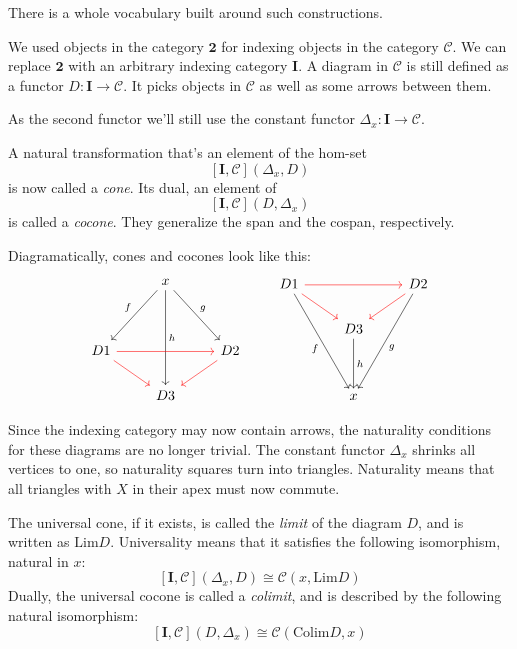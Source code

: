 \documentclass[DaoFP]{subfiles}
\begin{document}
There is a whole vocabulary built around such constructions. 

We used objects in the category $\mathbf{2}$ for indexing objects in the category $\mathcal{C}$. We can replace $\mathbf{2}$ with an arbitrary indexing category $\mathbf{I}$. A diagram in $\mathcal{C}$ is still defined as a functor $D \colon \mathbf{I} \to \mathcal{C}$. It picks objects in $\mathcal{C}$ as well as some arrows between them.

As the second functor we'll still use the constant functor $\Delta_x \colon \mathbf{I} \to \mathcal{C}$.

A  natural transformation that's an element of the hom-set
\[ [\mathbf{I}, \mathcal{C}](\Delta_x, D)  \]
is now called a \emph{cone}. Its dual, an element of
\[ [\mathbf{I}, \mathcal{C}](D, \Delta_x)  \]
is called a \emph{cocone}. They generalize the span and the cospan, respectively.

Diagramatically, cones and cocones look like this:
\[
 \begin{tikzcd}
  & x
\arrow[ddr, "g"]
 \arrow[ddl, "f"']
 \arrow[ddd, "h"]
 \\
\\
D 1 
\arrow[rr, red]
\arrow[rd, red]
&& D 2
\arrow[dl, red]
\\
& D 3
 \end{tikzcd}
 \qquad
\begin{tikzcd}
 D 1
 \arrow[rr, red]
 \arrow[dr, red]
 \arrow[dddr, "f"']
 && D 2
\arrow[dl, red]
 \arrow[dddl, "g"]
 \\
 & D 3
 \arrow[dd, "h"]
 \\
 \\
 & x
 \end{tikzcd}
 \]

Since the indexing category may now contain arrows, the naturality conditions for these diagrams are no longer trivial. The constant functor $\Delta_x$ shrinks all vertices to one, so naturality squares turn into triangles. Naturality means that all triangles with $X$ in their apex must now commute. 

The universal cone, if it exists, is called the \emph{limit} of the diagram $D$, and is written as $\text{Lim}D$. Universality means that it satisfies the following isomorphism, natural in $x$:
\[ [\mathbf{I}, \mathcal{C}](\Delta_x, D)  \cong \mathcal{C}(x, \text{Lim}D) \]
Dually, the universal cocone is called a \emph{colimit}, and is described by the following natural isomorphism:
\[ [\mathbf{I}, \mathcal{C}](D, \Delta_x)  \cong \mathcal{C}( \text{Colim}D, x) \]
\end{document}
